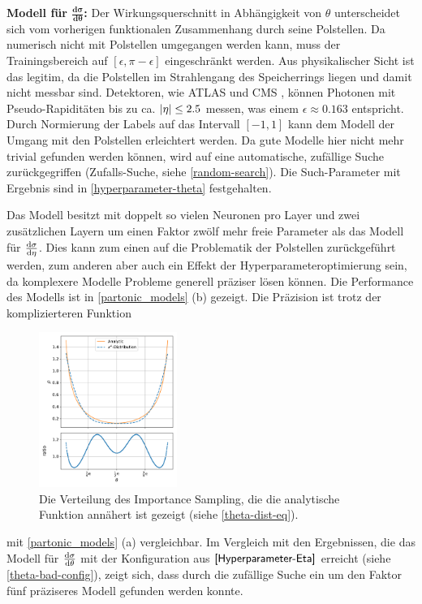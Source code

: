 \textbf{Modell für $\mathbf{\frac{d\sigma}{d\theta}}$:}
Der Wirkungsquerschnitt in Abhängigkeit von $\theta$ unterscheidet sich vom vorherigen funktionalen Zusammenhang durch seine Polstellen. Da numerisch nicht mit Polstellen umgegangen werden kann, muss der Trainingsbereich auf $[\epsilon, \pi-\epsilon]$ eingeschränkt werden. Aus physikalischer Sicht ist das legitim, da die Polstellen im Strahlengang des Speicherrings liegen und damit nicht messbar sind. Detektoren, wie ATLAS \cite{ATLAS} und CMS \cite{CMS}, können Photonen mit Pseudo-Rapiditäten bis zu ca. $\abs{\eta} \leq 2.5$ messen, was einem $\epsilon \approx 0.163$ entspricht. Durch Normierung der Labels auf das Intervall $[-1, 1]$ kann dem Modell der Umgang mit den Polstellen erleichtert werden. Da gute Modelle hier nicht mehr trivial gefunden werden können, wird auf eine automatische, zufällige Suche zurückgegriffen (Zufalls-Suche, siehe \textsf{\autoref{random-search}}). Die Such-Parameter mit Ergebnis sind in \textsf{\autoref{hyperparameter-theta}} festgehalten.

Das Modell besitzt mit doppelt so vielen Neuronen pro Layer und zwei zusätzlichen Layern um einen Faktor zwölf mehr freie Parameter als das Modell für $\derivative{\sigma}{\eta}$. Dies kann zum einen auf die Problematik der Polstellen zurückgeführt werden, zum anderen aber auch ein Effekt der Hyperparameteroptimierung sein, da komplexere Modelle Probleme generell präziser lösen können. Die Performance des Modells ist in \textsf{\autoref{partonic_models} (b)} gezeigt. Die Präzision ist trotz der komplizierteren Funktion
\begin{figure}
	\centering
	\includegraphics[width=0.4\textwidth]{graphics/4}
	\caption{Die Verteilung des Importance Sampling, die die analytische Funktion annähert ist gezeigt (siehe \textsf{\autoref{theta-dist-eq}}).}
	\label{theta-dist}
\end{figure}
 mit \textsf{\autoref{partonic_models} (a)} vergleichbar. Im Vergleich mit den Ergebnissen, die das Modell für $\derivative{\sigma}{\theta}$ mit der Konfiguration aus $\textsf{\autoref{Hyperparameter-Eta}}$ erreicht (siehe \textsf{\autoref{theta-bad-config}}), zeigt sich, dass durch die zufällige Suche ein um den Faktor fünf präziseres Modell gefunden werden konnte.

